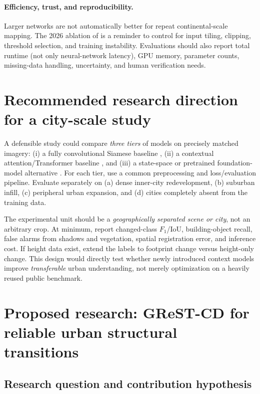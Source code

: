 \documentclass[11pt,a4paper]{article}
\begin{document}
\paragraph{Efficiency, trust, and reproducibility.} Larger networks are not automatically better for repeat continental-scale mapping. The 2026 ablation of \citet{Tiwari2026} is a reminder to control for input tiling, clipping, threshold selection, and training instability. Evaluations should also report total runtime (not only neural-network latency), GPU memory, parameter counts, missing-data handling, uncertainty, and human verification needs.

\section{Recommended research direction for a city-scale study}

A defensible study could compare \emph{three tiers} of models on precisely matched imagery: (i) a fully convolutional Siamese baseline \citep{Daudt2018}, (ii) a contextual attention/Transformer baseline \citep{ChenShi2020,ChenBIT2022,Bandara2022}, and (iii) a state-space or pretrained foundation-model alternative \citep{ChenMamba2024,ChengHsu2026}. For each tier, use a common preprocessing and loss/evaluation pipeline. Evaluate separately on (a) dense inner-city redevelopment, (b) suburban infill, (c) peripheral urban expansion, and (d) cities completely absent from the training data.

The experimental unit should be a \emph{geographically separated scene or city}, not an arbitrary crop. At minimum, report changed-class $F_1$/IoU, building-object recall, false alarms from shadows and vegetation, spatial registration error, and inference cost. If height data exist, extend the labels to footprint change versus height-only change. This design would directly test whether newly introduced context models improve \emph{transferable} urban understanding, not merely optimization on a heavily reused public benchmark.

\section{Proposed research: GReST-CD for reliable urban structural transitions}
\label{sec:proposed}

\subsection{Research question and contribution hypothesis}
\end{document}

